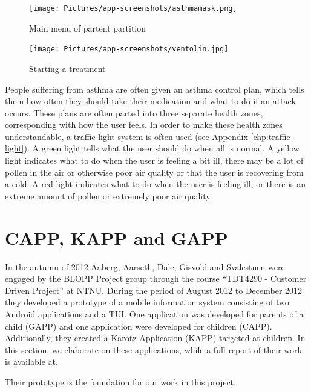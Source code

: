 \begin{figure}
	\begin{minipage}[b]{0.4\linewidth}
		\centering
			\texttt{[image: Pictures/app-screenshots/asthmamask.png]}
		\caption{Main menu of partent partition}
		\label{fig:parent_main_menu}
	\end{minipage}
	\begin{minipage}[b]{0.4\linewidth}
		\centering
			\texttt{[image: Pictures/app-screenshots/ventolin.jpg]}
		\caption{Starting a treatment}
		\label{fig:capp_start_treatment}
	\end{minipage}
\end{figure}

People suffering from asthma are often given an asthma control plan, which tells them how often they should take their medication and what to do if an attack occurs. These plans are often parted into three separate health zones, corresponding with how the user feels. In order to make these health zones understandable, a traffic light system is often used (see Appendix \ref{chp:traffic-light}). A green light tells what the user should do when all is normal. A yellow light indicates what to do when the user is feeling a bit ill, there may be a lot of pollen in the air or otherwise poor air quality or that the user is recovering from a cold. A red light indicates what to do when the user is feeling ill, or there is an extreme amount of pollen or extremely poor air quality.  


\section{CAPP, KAPP and GAPP}
\label{sec:cappgappkapp}
In the autumn of 2012 Aaberg, Aarseth, Dale, Gisvold and Svalestuen were engaged by the BLOPP Project group through the course ``TDT4290 - Customer Driven Project'' at NTNU. During the period of August 2012 to December 2012 they developed a prototype of a mobile information system consisting of two Android applications and a TUI. One application was developed for parents of a child (GAPP) and one application were developed for children (CAPP). Additionally, they created a Karotz Application (KAPP) targeted at children. In this section, we elaborate on these applications, while a full report of their work is available at\cite{CustomerDriven}. 

Their prototype is the foundation for our work in this project. 


